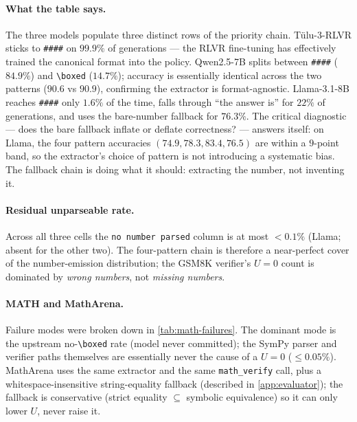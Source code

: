 \paragraph{What the table says.}
The three models populate three distinct rows of the priority chain.
Tülu-3-RLVR sticks to \texttt{\#\#\#\#} on $99.9\%$ of generations —
the RLVR fine-tuning has effectively trained the canonical format into
the policy. Qwen2.5-7B splits between \texttt{\#\#\#\#} ($84.9\%$) and
\texttt{\textbackslash boxed} ($14.7\%$); accuracy is essentially
identical across the two patterns ($90.6$ vs $90.9$), confirming the
extractor is format-agnostic. Llama-3.1-8B reaches \texttt{\#\#\#\#}
only $1.6\%$ of the time, falls through ``the answer is'' for $22\%$
of generations, and uses the bare-number fallback for $76.3\%$. The
critical diagnostic — does the bare fallback inflate or deflate
correctness? — answers itself: on Llama, the four pattern accuracies
$(74.9, 78.3, 83.4, 76.5)$ are within a $9$-point band, so the
extractor's choice of pattern is not introducing a systematic bias.
The fallback chain is doing what it should: extracting the number, not
inventing it.

\paragraph{Residual unparseable rate.}
Across all three cells the \texttt{no number parsed} column is at most
$<0.1\%$ (Llama; absent for the other two). The four-pattern chain is
therefore a near-perfect cover of the number-emission distribution;
the GSM8K verifier's $U{=}0$ count is dominated by \emph{wrong
numbers}, not \emph{missing numbers}.

\paragraph{MATH and MathArena.}
Failure modes were broken down in \cref{tab:math-failures}. The
dominant mode is the upstream no-\texttt{\textbackslash boxed} rate
(model never committed); the SymPy parser and verifier paths
themselves are essentially never the cause of a $U{=}0$
($\leq 0.05\%$). MathArena uses the same extractor and the same
\texttt{math\_verify} call, plus a whitespace-insensitive
string-equality fallback (described in \cref{app:evaluator}); the
fallback is conservative (strict equality $\subseteq$ symbolic
equivalence) so it can only lower $U$, never raise it.


